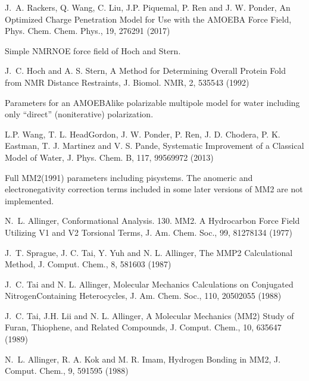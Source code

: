 \documentclass[letterpaper,11pt,english]{sphinxmanual}
\begin{document}
\sphinxAtStartPar
J. A. Rackers, Q. Wang, C. Liu, J.\sphinxhyphen{}P. Piquemal, P. Ren and J. W. Ponder, An Optimized Charge Penetration Model for Use with the AMOEBA Force Field,  Phys. Chem. Chem. Phys., 19, 276\sphinxhyphen{}291 (2017)

\sphinxAtStartPar
{}

\sphinxAtStartPar
Simple NMR\sphinxhyphen{}NOE force field of Hoch and Stern.

\sphinxAtStartPar
J. C. Hoch and A. S. Stern, A Method for Determining Overall Protein Fold from NMR Distance Restraints, J. Biomol. NMR, 2, 535\sphinxhyphen{}543 (1992)

\sphinxAtStartPar
{}

\sphinxAtStartPar
Parameters for an AMOEBA\sphinxhyphen{}like polarizable multipole model for water including only “direct” (non\sphinxhyphen{}iterative) polarization.

\sphinxAtStartPar
L.\sphinxhyphen{}P. Wang, T. L. Head\sphinxhyphen{}Gordon, J. W. Ponder, P. Ren, J. D. Chodera, P. K. Eastman, T. J. Martinez and V. S. Pande, Systematic Improvement of a Classical Model of Water, J. Phys. Chem. B, 117, 9956\sphinxhyphen{}9972 (2013)

\sphinxAtStartPar
{}

\sphinxAtStartPar
Full MM2(1991) parameters including pi\sphinxhyphen{}systems. The anomeric and electronegativity correction terms included in some later versions of MM2 are not implemented.

\sphinxAtStartPar
N. L. Allinger, Conformational Analysis. 130. MM2. A Hydrocarbon Force Field Utilizing V1 and V2 Torsional Terms, J. Am. Chem. Soc., 99, 8127\sphinxhyphen{}8134 (1977)

\sphinxAtStartPar
J. T. Sprague, J. C. Tai, Y. Yuh and N. L. Allinger, The MMP2 Calculational Method, J. Comput. Chem., 8, 581\sphinxhyphen{}603 (1987)

\sphinxAtStartPar
J. C. Tai and N. L. Allinger, Molecular Mechanics Calculations on Conjugated Nitrogen\sphinxhyphen{}Containing Heterocycles, J. Am. Chem. Soc., 110, 2050\sphinxhyphen{}2055 (1988)

\sphinxAtStartPar
J. C. Tai, J.\sphinxhyphen{}H. Lii and N. L. Allinger, A Molecular Mechanics (MM2) Study of Furan, Thiophene, and Related Compounds, J. Comput. Chem., 10, 635\sphinxhyphen{}647 (1989)

\sphinxAtStartPar
N. L. Allinger, R. A. Kok and M. R. Imam, Hydrogen Bonding in MM2, J. Comput. Chem., 9, 591\sphinxhyphen{}595 (1988)
\end{document}
